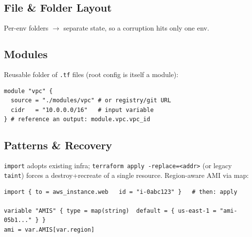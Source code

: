 \subsection{File \& Folder Layout}
\smallskip
Per-env folders $\to$ separate state, so a corruption hits only one env.
\subsection{Modules}
Reusable folder of \texttt{.tf} files (root config is itself a module):
\begin{lstlisting}[language=hcl]
module "vpc" {
  source = "./modules/vpc" # or registry/git URL
  cidr   = "10.0.0.0/16"   # input variable
} # reference an output: module.vpc.vpc_id
\end{lstlisting}
\subsection{Patterns \& Recovery}
\texttt{import} adopts existing infra; \texttt{terraform apply -replace=<addr>} (or legacy \texttt{taint}) forces a destroy+recreate of a single resource. Region-aware AMI via map:
\begin{lstlisting}[language=hcl]
import { to = aws_instance.web   id = "i-0abc123" }   # then: apply

variable "AMIS" { type = map(string)  default = { us-east-1 = "ami-05b1..." } }
ami = var.AMIS[var.region]
\end{lstlisting}
